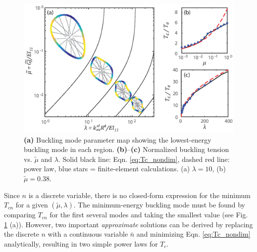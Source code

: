 \documentclass{bmd2016p}
\begin{document}
\begin{figure}[!ht]
\centering
\includegraphics[scale=1.0]{figures/bmd_figures-04.eps}
\caption{\textbf{(a)} Buckling mode parameter map showing the lowest-energy buckling mode in each region. \textbf{(b)}--\textbf{(c)} Normalized buckling tension vs. $\tilde{\mu}$ and $\lambda$. Solid black line: Eqn. \ref{eq:Tc_nondim}, dashed red line: power law, blue stars = finite-element calculations. (a) $\lambda=10$, (b) $\tilde{\mu} = 0.38$.}
\label{fig:Tc_nondim}
\end{figure}

Since $n$ is a discrete variable, there is no closed-form expression for the minimum $T_{cn}$ for a given $(\tilde{\mu},\lambda)$. The minimum-energy buckling mode must be found by comparing $T_{cn}$ for the first several modes and taking the smallest value (see Fig. \ref{fig:Tc_nondim} (a)). However, two important \textit{approximate} solutions can be derived by replacing the discrete $n$ with a continuous variable $\bar{n}$ and minimizing Eqn. \ref{eq:Tc_nondim} analytically, resulting in two simple power laws for $T_c$.
\end{document}
